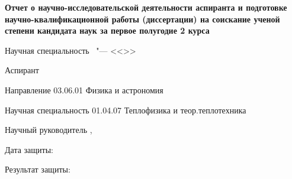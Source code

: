 \thispagestyle{empty}
\begin{center}
\thesisOrganization
\end{center}
%
\vspace{0pt plus4fill} %
\begin{center}
\textbf {\large Отчет о научно-исследовательской деятельности аспиранта и подготовке научно-квалификационной работы
(диссертации) на соискание ученой степени кандидата наук за первое полугодие 2 курса}
\end{center}
%
\begin{center}
{\large %
\thesisTitle}

\vspace{0pt plus2fill} %
\begin{minipage}[b]{0.5\linewidth}
    \begin{flushright}
        Научная специальность \thesisSpecialtyNumber\ "---
        <<\thesisSpecialtyTitle>>
    \end{flushright}
  \end{minipage}

\vspace{0pt plus2fill} %
\end{center}


Аспирант
\hfill
\thesisAuthor

Направление
\hfill
03.06.01 Физика и астрономия

Научная специальность
\hfill
01.04.07 Теплофизика и теор.теплотехника

\vskip 0.2in

Научный руководитель
\hfill
{\supervisorFioShort, \supervisorRegaliaShort}

\vskip 0.2in

Дата защиты:

\vskip 0.2in

Результат защиты:

%
\vspace{0pt plus4fill} %
{\centering\thesisCity\  \thesisYear\par}
